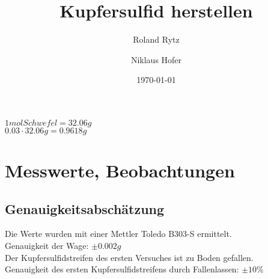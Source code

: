 \documentclass[11pt,paper=a4,final]{scrartcl}
\title{Kupfersulfid herstellen}
\author{Roland Rytz \and Niklaus Hofer}
\date{\today{}}
\begin{document}
\maketitle
\newpage
\( 1mol Schwefel = 32.06g \)\\
\( 0.03 \cdot 32.06g = 0.9618g \)
\section{Messwerte, Beobachtungen}
\subsection{Genauigkeitsabsch\"atzung}
Die Werte wurden mit einer Mettler Toledo B303-S ermittelt.\\
Genauigkeit der Wage: \(\pm 0.002g\)\\
Der Kupfersulfidstreifen des ersten Versuches ist zu Boden gefallen. \\
Genauigkeit des ersten Kupfersulfidstreifens durch Fallenlassen: \(\pm 10\% \)
\end{document}
